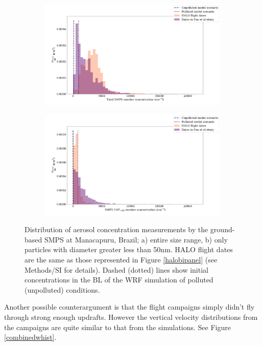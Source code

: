 \documentclass{article}
\begin{document}
\begin{figure}[ht]
	\centering
	\begin{subfigure}{0.7\textwidth}
		\includegraphics[width=\textwidth]{goama/v1_FINAL_tot_compare_nconc_hist_alldates_figure.png}
		\label{goamatothist}
		\caption{}
	\end{subfigure}
	\begin{subfigure}{0.7\textwidth}
		\includegraphics[width=\textwidth]{goama/v1_FINAL_uap50_compare_nconc_hist_alldates_figure.png}
		\label{goamauap50hist}
		\caption{}
	\end{subfigure}
	\caption{Distribution of aerosol concentration measurements by the ground-based SMPS at Manacapuru, Brazil; a) entire size range, b) only particles with diameter greater less than 50nm. HALO flight dates are the same as those represented in Figure \ref{halobipanel} (see Methods/SI for details). Dashed (dotted) lines show initial concentrations in the BL of the WRF simulation of polluted (unpolluted) conditions.}
	\label{goamahist}
\end{figure}

Another possible counterargument is that the flight campaigns simply didn't fly through strong enough updrafts. However the vertical velocity distributions from the campaigns are quite similar to that from the simulations. See Figure \ref{combinedwhist}. 
\end{document}

